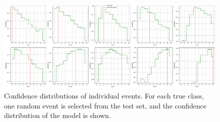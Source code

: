 \begin{figure}
  \centering
  \includegraphics[width=\textwidth]{content/plots/halftime/single_events.pdf}
  \caption{
    Confidence distributions of individual events.
    For each true class,
    one random event is selected from the test set,
    and the confidence distribution of the model is shown.
  }
  \label{fig:bootstrap:single_events}
\end{figure}
